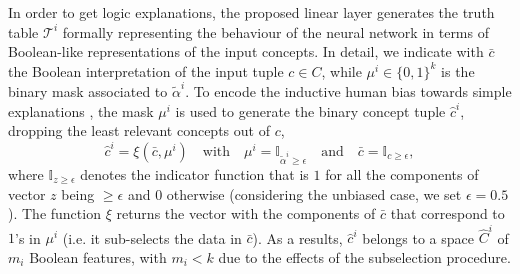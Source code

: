 In order to %
get logic explanations, the proposed linear layer generates the truth table $\mathcal{T}^i$ formally representing the behaviour of the neural network 
in terms of Boolean-like representations of the input concepts. %
In detail, we indicate with $\bar{c}$ the Boolean interpretation of the input tuple $c \in C$, while $\mu^i \in \{0,1\}^k$ is the binary mask associated to $\tilde{\alpha}^i$.
To encode the inductive human bias towards simple explanations \citep{miller1956magical,cowan2001magical,ma2014changing}, the 
mask %
$\mu^i$
is used to generate the 
binary %
concept tuple $\hat{c}^i$, 
dropping %
the least relevant concepts out of $c$,
\begin{equation}\label{eq:sparse}
    \hat{c}^i = \xi(\bar{c}, \mu^i)  \quad \text{with} \quad
    \mu^i = \mathbb{I}_{\tilde{\alpha}^i \geq \epsilon} \quad \text{and} \quad \bar{c} = \mathbb{I}_{c \geq \epsilon},
\end{equation}
where $\mathbb{I}_{z \geq \epsilon}$ denotes the indicator function that is $1$ for all the components of vector $z$ being $\geq \epsilon$ and $0$ otherwise (considering the unbiased case, we set $\epsilon=0.5$).
The function $\xi$ returns the vector with the components of $\bar{c}$ that correspond to $1$'s in $\mu^i$ (i.e. it sub-selects the data in $\bar{c}$).
As a results, $\hat{c}^i$ belongs to a space $\hat{C}^i$ of $m_i$ Boolean features, with $m_i < k$ due to the effects of the subselection procedure.

